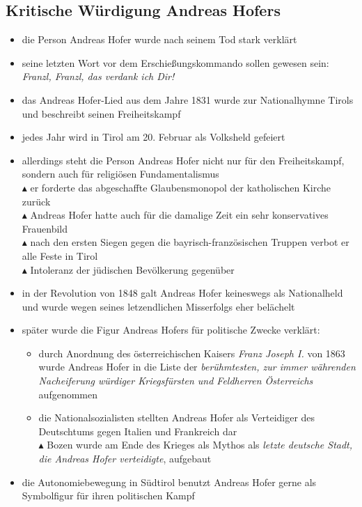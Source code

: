 \documentclass[11pt,a4paper]{article}
\begin{document}
\subsection*{\color{purplecolor} Kritische Würdigung Andreas Hofers}

\begin{itemize}

\item die Person Andreas Hofer wurde nach seinem Tod stark verklärt

\item seine letzten Wort vor dem Erschießungskommando sollen gewesen sein: \glqq\emph{Franzl, Franzl, das verdank ich Dir!}\grqq

\item das Andreas Hofer-Lied aus dem Jahre 1831 wurde zur Nationalhymne Tirols und beschreibt seinen Freiheitskampf

\item jedes Jahr wird in Tirol am 20. Februar als Volksheld gefeiert

\item allerdings steht die Person Andreas Hofer nicht nur für den Freiheitskampf, sondern auch für religiösen Fundamentalismus\\
	$\blacktriangle$ er forderte das abgeschaffte Glaubensmonopol der katholischen Kirche zurück\\
	$\blacktriangle$ Andreas Hofer hatte auch für die damalige Zeit ein sehr konservatives Frauenbild\\
	$\blacktriangle$ nach den ersten Siegen gegen die bayrisch-französischen Truppen verbot er alle Feste in Tirol\\
	$\blacktriangle$ Intoleranz der jüdischen Bevölkerung gegenüber

\item in der Revolution von 1848 galt Andreas Hofer keineswegs als Nationalheld und wurde wegen seines letzendlichen Misserfolgs eher belächelt

\item später wurde die Figur Andreas Hofers für politische Zwecke verklärt:

	\begin{itemize}

	\item durch Anordnung des österreichischen Kaisers \textsl{Franz Joseph I.} von 1863 wurde Andreas Hofer in die Liste der \emph{berühmtesten, zur immer währenden Nacheiferung würdiger Kriegsfürsten und Feldherren Österreichs} aufgenommen

	\item die Nationalsozialisten stellten Andreas Hofer als Verteidiger des Deutschtums gegen Italien und Frankreich dar\\
		$\blacktriangle$ Bozen wurde am Ende des Krieges als Mythos als \emph{letzte deutsche Stadt, die Andreas Hofer verteidigte}, aufgebaut

	\end{itemize}

\item die Autonomiebewegung in Südtirol benutzt Andreas Hofer gerne als Symbolfigur für ihren politischen Kampf

\end{itemize}
\end{document}
